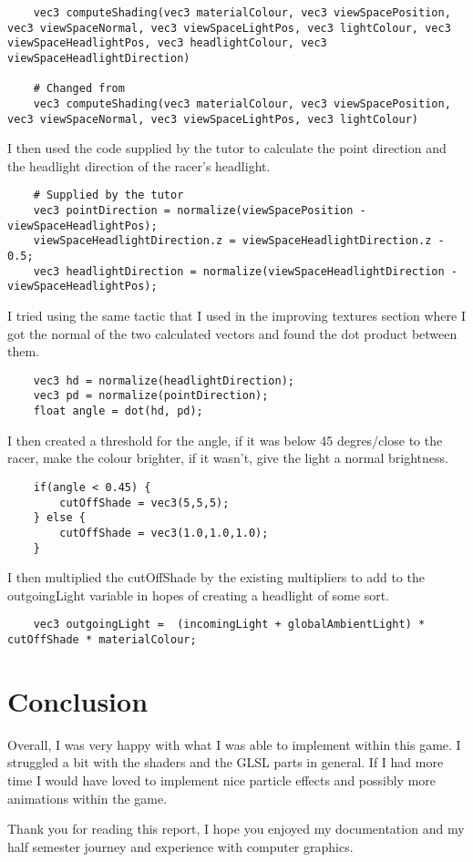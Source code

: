 \documentclass[11pt, oneside, a4paper]{article}
\begin{document}
\begin{lstlisting}
    vec3 computeShading(vec3 materialColour, vec3 viewSpacePosition, vec3 viewSpaceNormal, vec3 viewSpaceLightPos, vec3 lightColour, vec3 viewSpaceHeadlightPos, vec3 headlightColour, vec3 viewSpaceHeadlightDirection)

    # Changed from
    vec3 computeShading(vec3 materialColour, vec3 viewSpacePosition, vec3 viewSpaceNormal, vec3 viewSpaceLightPos, vec3 lightColour)
\end{lstlisting}

I then used the code supplied by the tutor to calculate the point direction and the headlight direction of the racer's headlight.

\begin{lstlisting}
    # Supplied by the tutor
    vec3 pointDirection = normalize(viewSpacePosition - viewSpaceHeadlightPos);
    viewSpaceHeadlightDirection.z = viewSpaceHeadlightDirection.z - 0.5;
    vec3 headlightDirection = normalize(viewSpaceHeadlightDirection - viewSpaceHeadlightPos);
\end{lstlisting}

I tried using the same tactic that I used in the improving textures section where I got the normal of the two calculated vectors and found the dot product between them. 
\begin{lstlisting}
    vec3 hd = normalize(headlightDirection);
    vec3 pd = normalize(pointDirection);  
    float angle = dot(hd, pd);
\end{lstlisting}

I then created a threshold for the angle, if it was below 45 degres/close to the racer, make the colour brighter, if it wasn't, give the light a normal brightness.
\begin{lstlisting}
    if(angle < 0.45) {
        cutOffShade = vec3(5,5,5);
    } else {
        cutOffShade = vec3(1.0,1.0,1.0);
    }
\end{lstlisting}

I then multiplied the cutOffShade by the existing multipliers to add to the outgoingLight variable in hopes of creating a headlight of some sort.
\begin{lstlisting}
    vec3 outgoingLight =  (incomingLight + globalAmbientLight) * cutOffShade * materialColour;
\end{lstlisting}



\newpage
\section{Conclusion}
Overall, I was very happy with what I was able to implement within this game. I struggled a bit with the shaders and the GLSL parts in general. If I had more time I would have loved to implement nice particle effects and possibly more animations within the game.

Thank you for reading this report, I hope you enjoyed my documentation and my half semester journey and experience with computer graphics.
\end{document}
